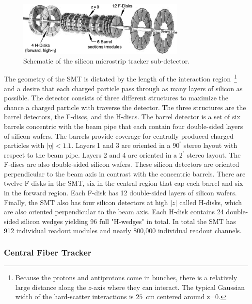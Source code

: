 \begin{figure}[!h!tbp]
\begin{center}
\includegraphics[width=0.75\textwidth]{eps/D0/SMT2.eps}
\end{center}
\vspace{-0.1in}
\caption{Schematic of the silicon microstrip tracker sub-detector.}
\label{SMT}
\end{figure}

The geometry of the SMT is dictated by the length of the interaction region~\footnote{Because the protons and antiprotons come in bunches, there is a relatively large distance along the $z$-axis where they can interact. The typical Gaussian width of the hard-scatter interactions is $25$~cm centered around z=0.} and a desire that each charged particle pass through as many layers of silicon as possible. The detector consists of three different structures to maximize the chance a charged particle with traverse the detector. The three structures are the barrel detectors, the F-discs, and the H-discs. The barrel detector is a set of six barrels concentric with the beam pipe that each contain four double-sided layers of silicon wafers. The barrels provide coverage for centrally produced charged particles with $|\eta|<1.1$. Layers 1 and 3 are oriented in a $90^{^\circ}$ stereo layout with respect to the beam pipe. Layers 2 and 4 are oriented in a $2^{^\circ}$ stereo layout. The F-discs are also double-sided silicon wafers. These silicon detectors are oriented perpendicular to the beam axis in contrast with the concentric barrels. There are twelve F-disks in the SMT, six in the central region that cap each barrel and six in the forward region. Each F-disk has 12 double-sided layers of silicon wafers. Finally, the SMT also has four silicon detectors at high $|z|$ called H-disks, which are also oriented perpendicular to the beam axis. Each H-disk contains 24 double-sided silicon wedges yielding 96 full "H-wedges" in total. In total the SMT has 912 individual readout modules and nearly 800,000 individual readout channels.


\subsubsection{Central Fiber Tracker}

